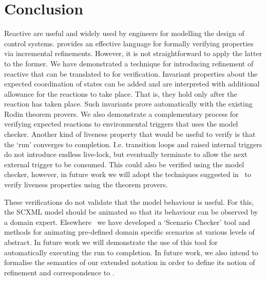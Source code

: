 \section{Conclusion}
\label{sec:conc}

Reactive \SCs are useful and widely used by engineers for modelling the design of control systems. 
\EventB provides an effective language for formally verifying properties via incremental refinements.
However, it is not straightforward to apply the latter to the former.
We have demonstrated a technique for introducing refinement of reactive \SCs that can be translated to \EventB for verification.
Invariant properties about the expected coordination of states can be added and are interpreted with additional allowance for the reactions to take place.
That is, they hold only after the reaction has taken place.
Such invariants prove automatically with the existing Rodin theorem provers.
We also demonstrate a complementary process for verifying expected reactions to environmental triggers that uses the \LTL model checker.
Another kind of liveness property that would be useful to verify is that the `run' converges to completion.
I.e. transition loops and raised internal triggers do not introduce endless live-lock, but eventually terminate to allow the next external trigger to be consumed.
This could also be verified using the \LTL model checker, however, in future work we will adopt the techniques suggested in~\cite{hudon16:_unit_b_method} to verify liveness properties using the theorem provers.

These verifications do not validate that the model behaviour is useful.
For this, the SCXML model should be animated so that its behaviour can be observed by a domain expert.
Elsewhere~\cite{snook20JSA} we have developed a `Scenario Checker' tool and methods for animating pre-defined domain specific scenarios at various levels of abstract.
In future work we will demonstrate the use of this tool for automatically executing the run to completion.
In future work, we also intend to formalise the semantics of our extended \SCXML notation in order to define its notion of refinement and correspondence to \EventB. 



